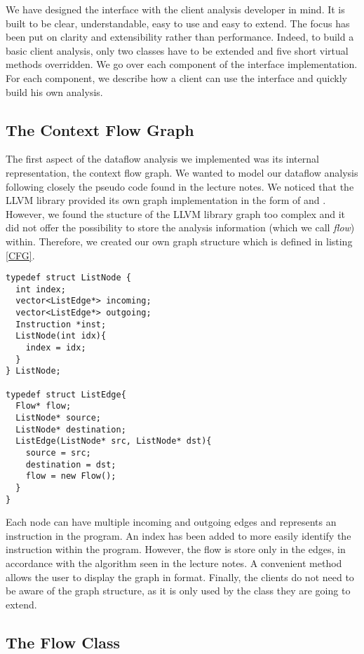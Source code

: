 We have designed the interface with the client analysis developer in mind.
It is built to be clear, understandable, easy to use and easy to extend. The focus has been put on clarity and extensibility rather than performance. Indeed, to build a basic client analysis, only two classes have to be extended and five short virtual methods overridden. We go over each component of the interface implementation. For each component, we describe how a client can use the interface and quickly build his own analysis.

\subsection{The Context Flow Graph}
The first aspect of the dataflow analysis we implemented was its internal representation, the context flow graph.
We wanted to model our dataflow analysis following closely the pseudo code found in the lecture notes. We noticed that the LLVM library provided its own graph implementation in the form of  and . However, we found the stucture of the LLVM library graph too complex and it did not offer the possibility to store the analysis information (which we call \emph{flow}) within. Therefore, we created our own graph structure which is defined in listing \ref{CFG}.

\begin{lstlisting}[caption=Context Flow Graph, label=CFG]
typedef struct ListNode {
  int index;
  vector<ListEdge*> incoming;
  vector<ListEdge*> outgoing;
  Instruction *inst;
  ListNode(int idx){
    index = idx;
  }
} ListNode;

typedef struct ListEdge{
  Flow* flow;
  ListNode* source;
  ListNode* destination;
  ListEdge(ListNode* src, ListNode* dst){
    source = src;
    destination = dst;
    flow = new Flow();
  }
} 
\end{lstlisting}

Each node can have multiple incoming and outgoing edges and represents an instruction in the program. An index has been added to more easily identify the instruction within the program. However, the flow is store only in the edges, in accordance with the algorithm seen in the lecture notes. A convenient method allows the user to display the graph in  format. Finally, the clients do not need to be aware of the graph structure, as it is only used by the class they are going to extend.

\subsection{The Flow Class}

